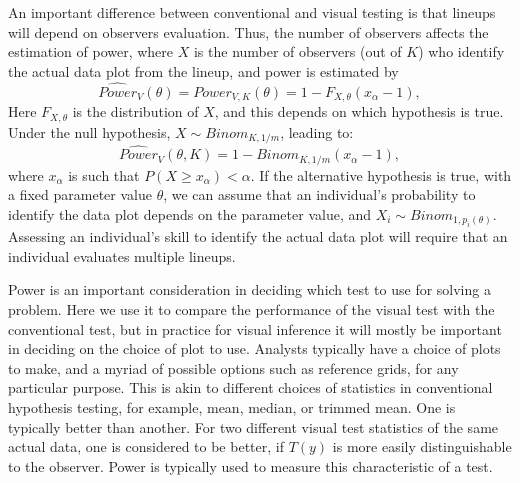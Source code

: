 \documentclass[12pt]{article}
\newcommand{\red}[1]{{\color{red} #1}}
\begin{document}
\noindent An important difference between conventional and visual testing is that lineups will depend on observers evaluation. Thus, the number of observers affects the estimation of power, where $X$ is the number of observers (out of $K$) who identify the actual data plot from the lineup, and power is estimated by
\[
\widehat{Power}_{V} (\theta) = {Power}_{V, K} (\theta) = 1 - F_{X, \theta} (x_{\alpha} - 1),
\] 
Here $F_{X, \theta}$ is the distribution of $X$, and this depends on which hypothesis is true.
Under the null hypothesis, $X \sim Binom_{K, 1/m}$, leading to:
\[
\widehat{Power}_V(\theta, K)= 1 - Binom_{K, 1/m} (x_\alpha - 1),
\]
where $x_\alpha$ is such that $P(X \ge x_{\alpha}) < \alpha$. 
If the alternative hypothesis is true, with a fixed parameter value $\theta$, we can assume that an individual's probability to identify the data plot depends on the parameter value, and $X_i \sim Binom_{1, p_i(\theta)}$. Assessing an individual's skill to identify the actual data plot will require that an individual evaluates multiple lineups.




Power is an important consideration in deciding which test to use for solving a problem. %
Here we use it to compare the performance of the visual test with the conventional test, but in practice for visual inference it will mostly be important in deciding on the choice of plot to use. Analysts typically have a choice of plots to make, and a myriad of possible options such as reference grids, for any particular purpose. This is akin to different choices of statistics in conventional hypothesis testing, for example, mean, median, or trimmed mean. One is typically better than another. For two different visual test statistics of the same actual data, one is considered to be better, if $T(y)$ is more easily distinguishable to the observer. Power is typically used to measure this characteristic of a test. %
\end{document}
